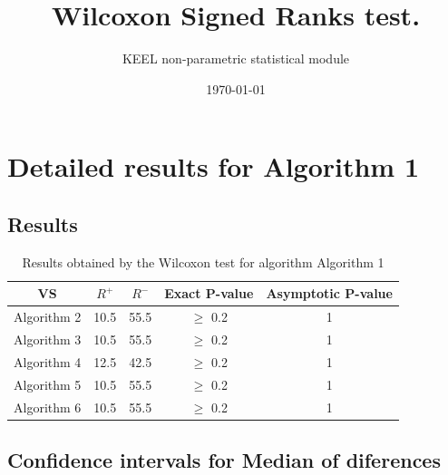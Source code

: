 \documentclass[a4paper,10pt]{article}
\title{Wilcoxon Signed Ranks test.}
\date{\today}
\author{KEEL non-parametric statistical module}
\begin{document}
\pagestyle{empty}
\maketitle
\thispagestyle{empty}



\section{Detailed results for Algorithm 1}


\subsection{Results}

\begin{table}[!htp]
\centering\small
\begin{tabular}{
|c|c|c|c|c|}
\hline
 VS & $R^{+}$ & $R^{-}$ & Exact P-value & Asymptotic P-value \\ \hline 
Algorithm 2 & 10.5 & 55.5 & $\geq$ 0.2 & 1\\ \hline 
Algorithm 3 & 10.5 & 55.5 & $\geq$ 0.2 & 1\\ \hline 
Algorithm 4 & 12.5 & 42.5 & $\geq$ 0.2 & 1\\ \hline 
Algorithm 5 & 10.5 & 55.5 & $\geq$ 0.2 & 1\\ \hline 
Algorithm 6 & 10.5 & 55.5 & $\geq$ 0.2 & 1\\ \hline 

\end{tabular}
\caption{Results obtained by the Wilcoxon test for algorithm Algorithm 1}
\end{table}

\subsection{Confidence intervals for Median of diferences}
\end{document}
